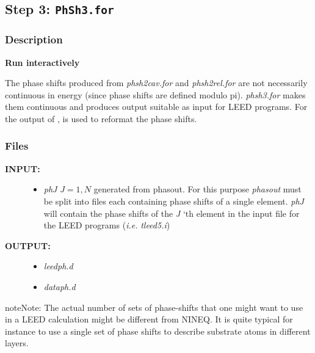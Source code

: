 \documentclass[letterpaper,10pt,english]{sphinxmanual}
\begin{document}
\subsection{Step 3: \texttt{PhSh3.for}}
\label{phshift2007:step-3-phsh3-for}

\subsubsection{Description}
\label{phshift2007:id5}
\textbf{Run interactively}

The phase shifts produced from \emph{phsh2cav.for} and \emph{phsh2rel.for}
are not necessarily continuous in energy (since phase
shifts are defined modulo pi). \emph{phsh3.for} makes them continuous
and produces output suitable as input for LEED programs.
For the output of ,  is used to reformat
the phase shifts.


\subsubsection{Files}
\label{phshift2007:id6}\begin{description}
\item[{\textbf{INPUT:}}] \leavevmode\begin{itemize}
\item {} 
\emph{phJ} $J = 1, N$  generated from phasout. For this purpose
\emph{phasout} must be split into files each containing
phase shifts of a single element. \emph{phJ} will contain
the phase shifts of the \emph{J} `th element in the
input file for the LEED programs (\emph{i.e.} \emph{tleed5.i})

\end{itemize}

\item[{\textbf{OUTPUT:}}] \leavevmode\begin{itemize}
\item {} 
\emph{leedph.d}

\item {} 
\emph{dataph.d}

\end{itemize}

\end{description}

\begin{notice}{note}{Note:}
The actual number of sets of phase-shifts that one might
want to use in a LEED calculation might be different
from NINEQ. It is quite typical for instance to use a
single set of phase shifts to describe substrate atoms
in different layers.
\end{notice}
\end{document}
